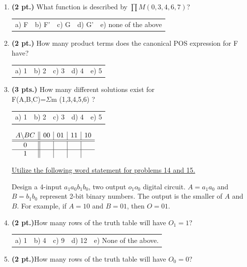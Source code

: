\documentclass{article}
\begin{document}
\begin{enumerate}
\item {\bf (2 pt.)} What function is described by $\prod M(0,3,4,6,7)$?

\begin{tabular}{p{0.7in} p{0.7in} p{0.7in} p{0.7in} l}
a) F & b) F' & c) G & d) G' & e) none of the above
\end{tabular}

\item {\bf (2 pt.)} How many product terms does the canonical POS expression 
for F have?

\begin{tabular}{p{0.7in} p{0.7in} p{0.7in} p{0.7in} l}
a) 1 & b) 2 & c) 3 & d) 4 & e) 5
\end{tabular}

\item {\bf (3 pts.)} How many different \SOPmin solutions exist for \\
F(A,B,C)=$\Sigma$m (1,3,4,5,6) ?

\begin{tabular}{p{0.7in} p{0.7in} p{0.7in} p{0.7in} l}
a) 1 & b) 2 & c) 3 & d) 4 & e) 5
\end{tabular}

$ \begin{array} {c||c|c|c|c}
        A \backslash BC & 00 & 01 & 11 & 10 \\ \hline \hline
        0        &    &    &    &    \\ \hline
        1        &    &    &    &    \\ 
\end{array} $


\pagebreak

\underline{Utilize the following word statement for problems 14 and 15.}


Design a 4-input $a_1a_0b_1b_0$, two output $o_1 o_0$ digital circuit.  
$A=a_1a_0$ and $B=b_1b_0$ represent 2-bit binary numbers.  The output 
is the smaller of $A$ and $B$.  For example, if $A=10$ and $B=01$, then $O=01$.

\item {\bf (2 pt.)}How many rows of the truth table will have $O_1 = 1$?

\begin{tabular}{p{0.7in} p{0.7in} p{0.7in} p{0.7in} l}
a) 1 & b) 4 & c) 9 & d) 12 & e) None of the above.
\end{tabular}

\item {\bf (2 pt.)}How many rows of the truth table will have $O_0 = 0$?


\end{enumerate}
\end{document}
